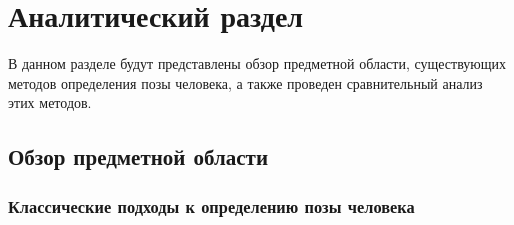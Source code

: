 
\chapter{Аналитический раздел}

В данном разделе будут представлены обзор предметной области, существующих методов определения позы человека, а также проведен сравнительный анализ этих методов.

\section{Обзор предметной области}

\subsection{Классические подходы к определению позы человека}

